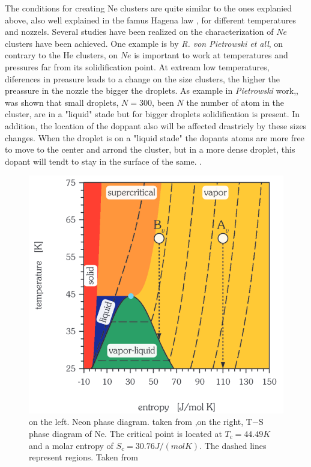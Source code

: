  The conditions for creating Ne clusters are quite similar to the ones explanied above, also well explained in the famus Hagena law \cite{hagena_cluster_1972-1}, for different temperatures and nozzels. Several studies have been realized on the characterization of $Ne$ clusters have been achieved. One example is  by \textit{R. von Pietrowski et all}, on contrary to the He clusters, on $Ne$ is important to work at temperatures and pressures far from its solidification point. At extream low temperatures, diferences in preasure leads to a change on the size clusters, the higher the preassure in the nozzle the bigger the droplets. As example in \textit{Pietrowski} work,, was shown that small droplets, $N=300$, been $N$ the number of atom in the cluster, are in a "liquid" stade but for bigger droplets solidification is present. In addition, the location of the doppant also will be affected drastricly by these sizes changes. When the droplet is on a "liquid stade" the dopants atoms are more free to move to the center and arrond the cluster, but in a more dense droplet, this dopant will tendt to stay in the surface of the same. \cite{von_pietrowski_fluorescence_1997}.

\begin{figure}[hbtp]
\centering
\label{img:t-s_Ne}
\includegraphics[width= 8 cm]{../Images/T-s ne phase diagran.png} 
\caption{on the left. Neon phase diagram. taken from \cite{young_phase_nodate},on the right, T$-$S phase diagram of Ne. The critical point is located at $T_{c}= 44.49 K$ and a molar entropy of $S_{c}=30.76 J/(mol
K)$. The dashed lines represent regions. Taken from \cite{christen_supersonic_2010-1} }
\end{figure}

